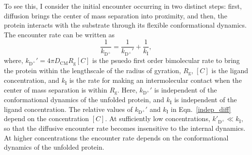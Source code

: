 \documentclass[../talant.diss.submit.tex]{subfiles}
\begin{document}
To see this, I consider the initial encounter occurring in two distinct steps:
first, diffusion brings the center of mass separation into proximity, and then, the protein
interacts with the substrate through its flexible conformational dynamics. The encounter rate
can be written as
%
\begin{equation}
  \label{indep_diff}
  \frac{1}{k_{\mathrm{D}^+}} = \frac{1}{k_{\mathrm{D}^+}'} + \frac{1}{k_{\mathrm{I}}},
\end{equation}                                                                                           
where, $k_{\mathrm{D}^+}' = 4\pi D_{\mathrm{CM}} R_\mathrm{g} [C]$ is
the psuedo first order bimolecular rate to bring the protein within the
lengthscale of the radius of gyration, $R_\mathrm{g}$, $[C]$ is the ligand
concentration, and $k_\mathrm{I}$ is the rate for making an intermolecular
contact when the center of mass separation is within $R_\mathrm{g}$. Here,
$k_{\mathrm{D}^+}'$ is independent of the conformational dynamics of the
unfolded protein, and $k_\mathrm{I}$ is independent of the ligand concentration.
The relative values of  $k_{\mathrm{D}^+}'$ and $k_{\mathrm{I}}$ in Eqn.~\ref{indep_diff} depend on
the concentration $[C]$.
At sufficiently low concentrations,  $k'_{\mathrm{D}^+} \ll k_\mathrm{I}$, so that
the diffusive encounter rate becomes insensitive to the internal dynamics. 
At higher concentrations the encounter rate depends on the conformational dynamics of the unfolded protein.



\end{document}
